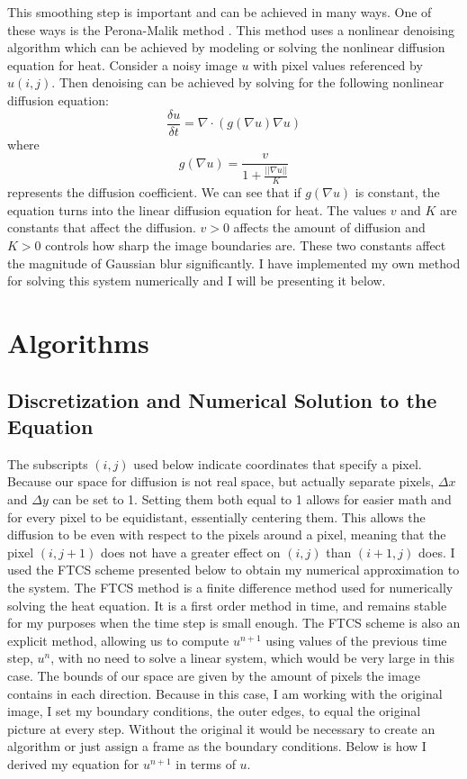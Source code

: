 \documentclass[12pt]{article}
\begin{document}
This smoothing step is important and can be achieved in many ways. One of these ways is the Perona-Malik method \cite{PM}. This method uses a nonlinear denoising algorithm which can be achieved by modeling or solving the nonlinear diffusion equation for heat. Consider a noisy image $u$ with pixel values referenced by $u(i,j)$. Then denoising can be achieved by solving for the following nonlinear diffusion equation:
\begin{equation}
\frac{\delta u}{\delta t}=\nabla \cdot (g(\nabla u)\nabla u)
\end{equation}
where
\begin{equation}
g(\nabla u)=\frac{v}{1+\frac{||\nabla u||}{K}}
\end{equation}
represents the diffusion coefficient. We can see that if $g(\nabla u)$ is constant, the equation turns into the linear diffusion equation for heat. The values $v$ and $K$ are constants that affect the diffusion. $v>0$ affects the amount of diffusion and $K>0$ controls how sharp the image boundaries are. These two constants affect the magnitude of Gaussian blur significantly. I have implemented my own method for solving this system numerically and I will be presenting it below.




\section{Algorithms}
\subsection{Discretization and Numerical Solution to the Equation}
The subscripts $(i,j)$ used below indicate coordinates that specify a pixel. Because our space for diffusion is not real space, but actually separate pixels, $\Delta x$ and $\Delta y$ can be set to 1. Setting them both equal to 1 allows for easier math and for every pixel to be equidistant, essentially centering them. This allows the diffusion to be even with respect to the pixels around a pixel, meaning that the pixel $(i,j+1)$ does not have a greater effect on $(i,j)$ than $(i+1,j)$ does. I used the FTCS scheme presented below to obtain my numerical approximation to the system. The FTCS method is a finite difference method used for numerically solving the heat equation. It is a first order method in time, and remains stable for my purposes when the time step is small enough. The FTCS scheme is also an explicit method, allowing us to compute $u^{n+1}$ using values of the previous time step, $u^n$, with no need to solve a linear system, which would be very large in this case. The bounds of our space are given by the amount of pixels the image contains in each direction. Because in this case, I am working with the original image, I set my boundary conditions, the outer edges, to equal the original picture at every step. Without the original it would be necessary to create an algorithm or just assign a frame as the boundary conditions. Below is how I derived my equation for $u^{n+1}$ in terms of $u$.
\end{document}
